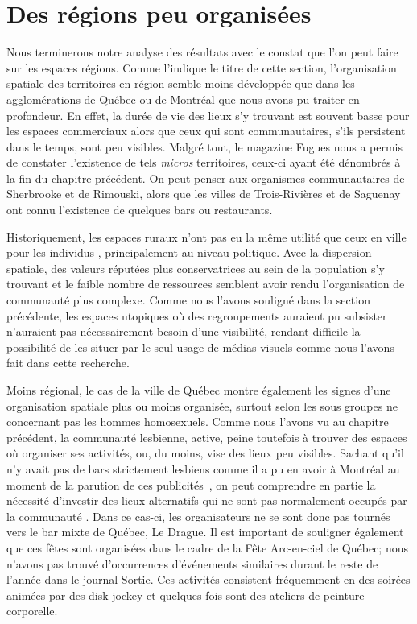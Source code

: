 \section{Des régions peu organisées}
\label{sec:des_regions_peu_organisees}
Nous terminerons notre analyse des résultats avec le constat que l'on peut faire sur les espaces régions.
Comme l'indique le titre de cette section, l'organisation spatiale des territoires en région semble moins développée que dans les agglomérations de Québec ou de Montréal que nous avons pu traiter en profondeur.
En effet, la durée de vie des lieux \lgbt{} s'y trouvant est souvent basse pour les espaces commerciaux alors que ceux qui sont communautaires, s'ils persistent dans le temps, sont peu visibles.
Malgré tout, le magazine Fugues nous a permis de constater l'existence de tels \emph{micros} territoires, ceux-ci ayant été dénombrés à la fin du chapitre précédent.
On peut penser aux organismes communautaires de Sherbrooke et de Rimouski, alors que les villes de Trois-Rivières et de Saguenay ont connu l'existence de quelques bars ou restaurants.

Historiquement, les espaces ruraux n'ont pas eu la même utilité que ceux en ville pour les individus \lgbt{}, principalement au niveau politique.
Avec la dispersion spatiale, des valeurs réputées plus conservatrices au sein de la population s'y trouvant et le faible nombre de ressources semblent avoir rendu l'organisation de communauté \lgbt{} plus complexe.
Comme nous l'avons souligné dans la section précédente, les espaces utopiques où des regroupements \lgbt{} auraient pu subsister n'auraient pas nécessairement besoin d'une visibilité, rendant difficile la possibilité de les situer par le seul usage de médias visuels comme nous l'avons fait dans cette recherche.

Moins régional, le cas de la ville de Québec montre également les signes d'une organisation spatiale plus ou moins organisée, surtout selon les sous groupes ne concernant pas les hommes homosexuels.
Comme nous l'avons vu au chapitre précédent, la communauté lesbienne, active, peine toutefois à trouver des espaces où organiser ses activités, ou, du moins, vise des lieux peu visibles.
Sachant qu'il n'y avait pas de bars strictement lesbiens comme il a pu en avoir à Montréal au moment de la parution de ces publicités~\citep{Podmore2006}, on peut comprendre en partie la nécessité d'investir des lieux alternatifs qui ne sont pas normalement occupés par la communauté \lgbt{}.
Dans ce cas-ci, les organisateurs ne se sont donc pas tournés vers le bar mixte de Québec, Le Drague.
Il est important de souligner également que ces fêtes sont organisées dans le cadre de la Fête Arc-en-ciel de Québec; nous n'avons pas trouvé d'occurrences d'événements similaires durant le reste de l'année dans le journal Sortie.
Ces activités consistent fréquemment en des soirées animées par des disk-jockey et quelques fois sont des ateliers de peinture corporelle.
